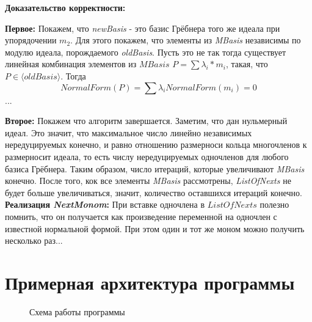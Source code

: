 \documentclass{article}
\begin{document}
    \newpage
    \textbf{Доказательство корректности:}

        \textbf{Первое:} Покажем, что \textit{newBasis} - это базис Грёбнера того же идеала при упорядочении $m_2$. 
        Для этого покажем, что элементы из \textit{MBasis} независимы по модулю идеала, порождаемого \textit{oldBasis}. Пусть это не так
        тогда существует линейная комбинация элементов из $MBasis$ $P = \sum \lambda_i*m_i$, такая, что $P\in \langle oldBasis\rangle$. Тогда
        $$NormalForm(P) = \sum \lambda_i NormalForm(m_i) = 0$$
        ...

        \textbf{Второе:} Покажем что алгоритм завершается. 
        Заметим, что дан нульмерный идеал. Это значит, что максимальное число линейно независимых нередуцируемых конечно, и равно
        отношению размерноси кольца многочленов к размерносит идеала, то есть числу нередуцируемых одночленов для любого базиса Грёбнера.
        Таким образом, число итераций, которые увеличивают \textit{MBasis} конечно. После того, кок все элементы \textit{MBasis} рассмотрены,
        \textit{ListOfNexts} не будет больше увеличиваться, значит, количество оставшихся итераций конечно.
    \newpage
    \textbf{Реализация \textit{NextMonom}:}
        При вставке одночлена в $ListOfNexts$ полезно помнить, что он получается как произведение переменной на одночлен с известной нормальной формой.
        При этом один и тот же моном можно получить несколько раз... 
    \newpage
\section{Примерная архитектура программы}

\begin{figure}[h!]
    \caption{Схема работы программы}
\end{figure}
\newpage
\end{document}
